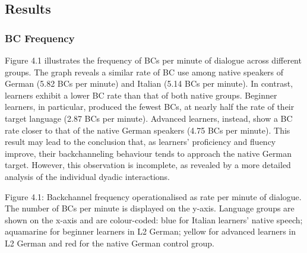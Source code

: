 \subsection[Results]{Results}
\hypertarget{Toc191305950}{}\subsubsection[BC Frequency]{BC Frequency}
\hypertarget{Toc191305951}{}\begin{styleStandard}
Figure 4.1 illustrates the frequency of BCs per minute of dialogue across different groups. The graph reveals a similar rate of BC use among native speakers of German (5.82 BCs per minute) and Italian (5.14 BCs per minute). In contrast, learners exhibit a lower BC rate than that of both native groups. Beginner learners, in particular, produced the fewest BCs, at nearly half the rate of their target language (2.87 BCs per minute). Advanced learners, instead, show a BC rate closer to that of the native German speakers (4.75 BCs per minute). This result may lead to the conclusion that, as learners' proficiency and fluency improve, their backchanneling behaviour tends to approach the native German target. However, this observation is incomplete, as revealed by a more detailed analysis of the individual dyadic interactions.
\end{styleStandard}

\begin{styleStandard}
  [Warning: Image ignored] %
 
\end{styleStandard}

\begin{stylecaption}
Figure 4.1:\textbf{ }Backchannel frequency operationalised as rate per minute of dialogue. The number of BCs per minute is displayed on the y-axis. Language groups are shown on the x-axis and are colour-coded: blue for Italian learners’ native speech; aquamarine for beginner learners in L2 German; yellow for advanced learners in L2 German and red for the native German control group.
\end{stylecaption}

